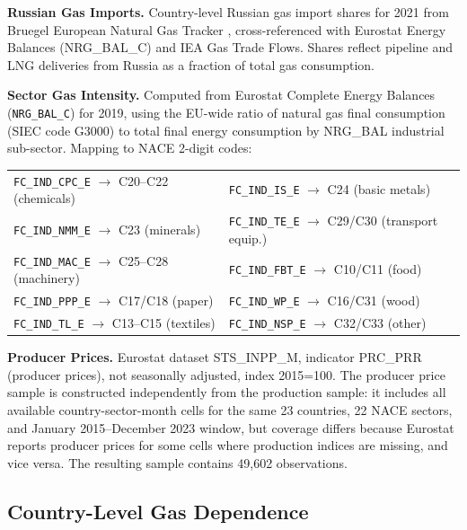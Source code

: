 \documentclass[12pt]{article}
\begin{document}
\textbf{Russian Gas Imports.} Country-level Russian gas import shares for 2021 from Bruegel European Natural Gas Tracker \citep{mcwilliams2022}, cross-referenced with Eurostat Energy Balances (NRG\_BAL\_C) and IEA Gas Trade Flows. Shares reflect pipeline and LNG deliveries from Russia as a fraction of total gas consumption.

\textbf{Sector Gas Intensity.} Computed from Eurostat Complete Energy Balances (\texttt{NRG\_BAL\_C}) for 2019, using the EU-wide ratio of natural gas final consumption (SIEC code G3000) to total final energy consumption by NRG\_BAL industrial sub-sector. Mapping to NACE 2-digit codes:

{\small
\begin{tabular}{@{}ll@{}}
\texttt{FC\_IND\_CPC\_E} $\rightarrow$ C20--C22 (chemicals) &
\texttt{FC\_IND\_IS\_E} $\rightarrow$ C24 (basic metals) \\
\texttt{FC\_IND\_NMM\_E} $\rightarrow$ C23 (minerals) &
\texttt{FC\_IND\_TE\_E} $\rightarrow$ C29/C30 (transport equip.) \\
\texttt{FC\_IND\_MAC\_E} $\rightarrow$ C25--C28 (machinery) &
\texttt{FC\_IND\_FBT\_E} $\rightarrow$ C10/C11 (food) \\
\texttt{FC\_IND\_PPP\_E} $\rightarrow$ C17/C18 (paper) &
\texttt{FC\_IND\_WP\_E} $\rightarrow$ C16/C31 (wood) \\
\texttt{FC\_IND\_TL\_E} $\rightarrow$ C13--C15 (textiles) &
\texttt{FC\_IND\_NSP\_E} $\rightarrow$ C32/C33 (other) \\
\end{tabular}
}

\textbf{Producer Prices.} Eurostat dataset STS\_INPP\_M, indicator PRC\_PRR (producer prices), not seasonally adjusted, index 2015=100. The producer price sample is constructed independently from the production sample: it includes all available country-sector-month cells for the same 23 countries, 22 NACE sectors, and January 2015--December 2023 window, but coverage differs because Eurostat reports producer prices for some cells where production indices are missing, and vice versa. The resulting sample contains 49,602 observations.

\subsection{Country-Level Gas Dependence}
\end{document}

